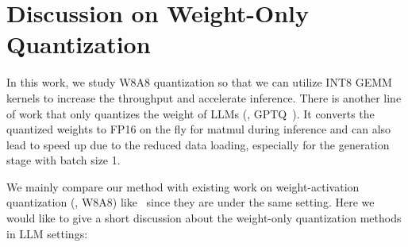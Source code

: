 \section{Discussion on Weight-Only Quantization}
\label{sec:supp_gptq_compare}
In this work, we study W8A8 quantization so that we can utilize INT8 GEMM kernels to increase the throughput and accelerate inference. There is another line of work that only quantizes the weight of LLMs (\eg, GPTQ~\cite{frantar2022gptq}). It converts the quantized weights to FP16 on the fly for matmul during inference and can also lead to speed up due to the reduced data loading, especially for the generation stage with batch size 1. 

We mainly compare our method with existing work on weight-activation quantization (\ie, W8A8) like~\cite{dettmers2022llmint8, zeroquant, outlier_suppression} since they are under the same setting. Here we would like to give a short discussion about the weight-only quantization methods in LLM settings:
